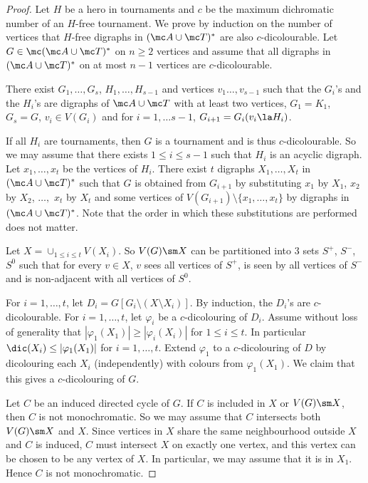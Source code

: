 \begin{proof}
Let $H$ be a hero in tournaments and $c$ be the maximum dichromatic number of an $H$-free tournament. 
We prove by induction on the number of vertices that $H$-free digraphs in $(\mc A \cup \mc T)^*$ are also $c$-dicolourable. 
Let $G \in \mc (\mc A \cup \mc T)^*$ on $n \geq 2$ vertices and assume that all digraphs in $\mathcal (\mc A \cup \mc T)^*$ on at most $n-1$ vertices are $c$-dicolourable. 

There exist $G_1, \dots, G_s$, $H_1, \dots, H_{s-1}$ and vertices $v_1 \dots, v_{s-1}$ such that  the $G_i$'s and the $H_i$'s are  digraphs of $\mc A \cup \mc T$ with at least two vertices, $G_1 = K_1$, $G_s = G$, $v_i \in V(G_i)$ and for $i=1, \dots s-1$, $G_{i+1} = G_{i}(v_{i} \la H_{i})$. 

If all $H_i$ are tournaments, then $G$ is a tournament and is thus $c$-dicolourable. 
So we may assume that there exists $1 \leq i \leq s-1$ such that $H_i$ is an acyclic digraph. 
Let $x_1, \dots, x_t$ be the vertices of $H_i$. 
There exist $t$ digraphs $X_1, \dots, X_t$ in $\mathcal (\mc A \cup \mc T)^*$  such that $G$ is obtained from $G_{i+1}$ by substituting $x_1$ by $X_1$, $x_2$ by $X_2$, $\dots,$ $x_t$ by $X_t$  and some vertices of $V(G_{i+1}) \setminus \{x_1, \dots, x_t\}$ by digraphs in $(\mc A \cup \mc T)^*$.  Note that the order in which  these substitutions are performed does not matter. 

Let $X = \cup_{1\leq i \leq  t} V(X_i)$. 
So $V(G) \sm X$ can be partitioned into $3$ sets $S^+$, $S^-$, $S^0$ such that for every $v \in X$, $v$ sees all vertices of $S^+$, is seen by all vertices of $S^-$ and is non-adjacent with all vertices of $S^0$. 

For $i=1, \dots, t$, let $D_i = G[G_i \setminus (X \setminus X_i)]$. 
By induction, the $D_i$'s are $c$-dicolourable. For $i=1, \dots, t$, let $\varphi_i$ be a $c$-dicolouring of $D_i$. 
Assume without loss of generality that $|\varphi_1(X_1)| \geq |\varphi_i(X_i)|$ for $1 \leq i \leq t$. 
In particular $\dic(X_i) \leq |\varphi_1(X_1)|$ for $i=1, \dots, t$. 
Extend $\varphi_1$ to a $c$-dicolouring of $D$ by dicolouring each $X_i$ (independently) with colours from $\varphi_1(X_1)$. We claim that this gives a $c$-dicolouring of $G$. 

Let $C$ be an induced directed cycle of $G$. If $C$ is included in $X$ or $V(G) \sm X$, then $C$ is not monochromatic. 
So we may assume that $C$ intersects both $V(G) \sm X$ and $X$. 
Since vertices in $X$ share the same neighbourhood outside $X$ and $C$ is induced, $C$ must intersect $X$ on exactly one vertex, and this vertex can be chosen to be any vertex of $X$. In particular, we may assume that it is in $X_1$. Hence $C$ is not monochromatic. 
\end{proof}

